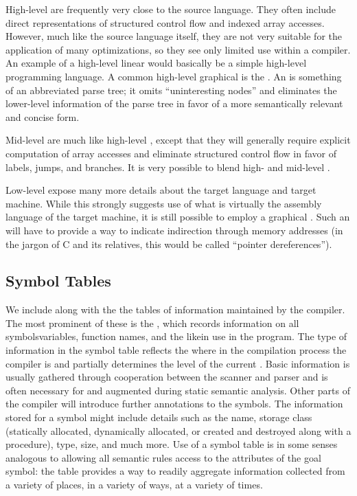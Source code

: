 High-level \IRs are frequently very close to the source language. They often include direct representations of structured control flow and indexed array accesses. However, much like the source language itself, they are not very suitable for the application of many optimizations, so they see only limited use within a compiler. An example of a high-level linear \IR would basically be a simple high-level programming language. A common high-level graphical \IR is the . An \AST is something of an abbreviated parse tree; it omits ``uninteresting nodes'' and eliminates the lower-level information of the parse tree in favor of a more semantically relevant and concise form.

Mid-level \IRs are much like high-level \IRs{}, except that they will generally require explicit computation of array accesses and eliminate structured control flow in favor of labels, jumps, and branches. It is very possible to blend high- and mid-level \IRs{}.

Low-level \IRs expose many more details about the target language and target machine. While this strongly suggests use of what is virtually the assembly language of the target machine, it is still possible to employ a graphical \IR{}. Such an \IR will have to provide a way to indicate indirection through memory addresses (in the jargon of C and its relatives, this would be called ``pointer dereferences'').

\subsection{Symbol Tables}
We include along with the \IR{} the tables of information maintained by the compiler. The most prominent of these is the , which records information on all symbols\empause variables, function names, and the like\empause in use in the program. The type of information in the symbol table reflects the where in the compilation process the compiler is and partially determines the level of the current \IR. Basic information is usually gathered through cooperation between the scanner and parser and is often necessary for and augmented during static semantic analysis. Other parts of the compiler will introduce further annotations to the symbols. The information stored for a symbol might include details such as the name, storage class (statically allocated, dynamically allocated, or created and destroyed along with a procedure), type, size, and much more. Use of a symbol table is in some senses analogous to allowing all semantic rules access to the attributes of the goal symbol: the table provides a way to readily aggregate information collected from a variety of places, in a variety of ways, at a variety of times.

